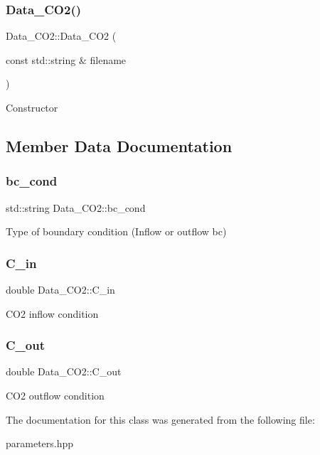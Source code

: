 \subsubsection{\texorpdfstring{Data\+\_\+\+C\+O2()}{Data\_CO2()}}
{\footnotesize\ttfamily Data\+\_\+\+C\+O2\+::\+Data\+\_\+\+C\+O2 (\begin{DoxyParamCaption}\item[{const std\+::string \&}]{filename }\end{DoxyParamCaption})\hspace{0.3cm}{\ttfamily [explicit]}}

Constructor 

\subsection{Member Data Documentation}
\mbox{\label{classData__CO2_a4e766fbbb699414eca692f02d5d3da50}} 
\subsubsection{\texorpdfstring{bc\+\_\+cond}{bc\_cond}}
{\footnotesize\ttfamily std\+::string Data\+\_\+\+C\+O2\+::bc\+\_\+cond}

Type of boundary condition (Inflow or outflow bc) \mbox{\label{classData__CO2_ab778c5d4c6789d809e9f38a4a8723d90}} 
\subsubsection{\texorpdfstring{C\+\_\+in}{C\_in}}
{\footnotesize\ttfamily double Data\+\_\+\+C\+O2\+::\+C\+\_\+in}

C\+O2 inflow condition \mbox{\label{classData__CO2_a57771d0dfef60d0de3eec5fe26649c19}} 
\subsubsection{\texorpdfstring{C\+\_\+out}{C\_out}}
{\footnotesize\ttfamily double Data\+\_\+\+C\+O2\+::\+C\+\_\+out}

C\+O2 outflow condition 

The documentation for this class was generated from the following file\+:\begin{DoxyCompactItemize}
\item 
parameters.\+hpp\end{DoxyCompactItemize}
